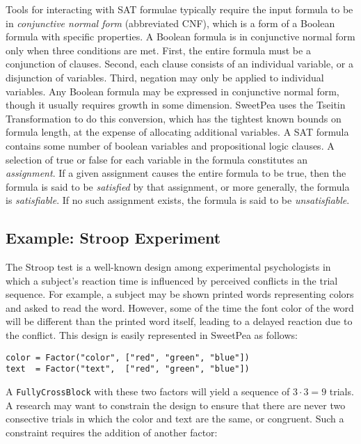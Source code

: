 Tools for interacting with SAT formulae typically require the input formula to be in \textit{conjunctive normal form} (abbreviated CNF), which is a form of a Boolean formula with specific properties. A Boolean formula is in conjunctive normal form only when three conditions are met. First, the entire formula must be a conjunction of clauses. Second, each clause consists of an individual variable, or a disjunction of variables. Third, negation may only be applied to individual variables. Any Boolean formula may be expressed in conjunctive normal form, though it usually requires growth in some dimension. SweetPea uses the Tseitin Transformation \cite{tseitin1983complexity} to do this conversion, which has the tightest known bounds on formula length, at the expense of allocating additional variables. A SAT formula contains some number of boolean variables and propositional logic clauses. A selection of true or false for each variable in the formula constitutes an \textit{assignment}. If a given assignment causes the entire formula to be true, then the formula is said to be \textit{satisfied} by that assignment, or more generally, the formula is \textit{satisfiable}. If no such assignment exists, the formula is said to be \textit{unsatisfiable}.

\subsection{Example: Stroop Experiment}

The Stroop test \cite{TODO} is a well-known design among experimental psychologists in which a subject's reaction time is influenced by perceived conflicts in the trial sequence. For example, a subject may be shown printed words representing colors and asked to read the word. However, some of the time the font color of the word will be different than the printed word itself, leading to a delayed reaction due to the conflict. This design is easily represented in SweetPea as follows:

\begin{verbatim}
color = Factor("color", ["red", "green", "blue"])
text  = Factor("text",  ["red", "green", "blue"])
\end{verbatim}

A \texttt{FullyCrossBlock} with these two factors will yield a sequence of $3 \cdot 3 = 9$ trials. A research may want to constrain the design to ensure that there are never two consective trials in which the color and text are the same, or congruent. Such a constraint requires the addition of another factor:

